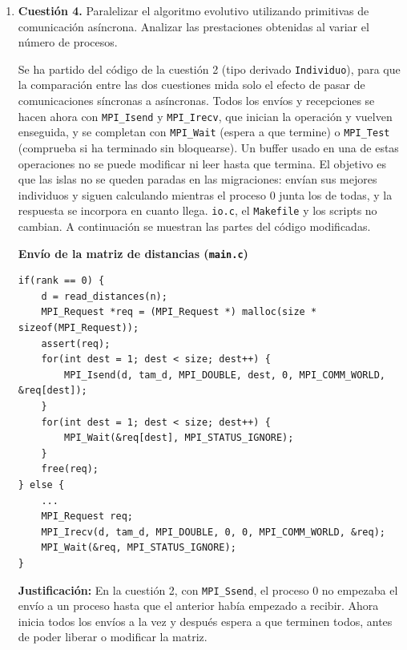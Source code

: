 \documentclass[12pt]{article}
\begin{document}
\begin{enumerate}
\newpage
\item \textbf{Cuestión 4.} Paralelizar el algoritmo evolutivo utilizando primitivas de comunicación asíncrona. Analizar las prestaciones obtenidas al variar el número de procesos.




Se ha partido del código de la cuestión 2 (tipo derivado \texttt{Individuo}), para que la comparación entre las dos cuestiones mida solo el efecto de pasar de comunicaciones síncronas a asíncronas. Todos los envíos y recepciones se hacen ahora con \texttt{MPI\_Isend} y \texttt{MPI\_Irecv}, que inician la operación y vuelven enseguida, y se completan con \texttt{MPI\_Wait} (espera a que termine) o \texttt{MPI\_Test} (comprueba si ha terminado sin bloquearse). Un buffer usado en una de estas operaciones no se puede modificar ni leer hasta que termina. El objetivo es que las islas no se queden paradas en las migraciones: envían sus mejores individuos y siguen calculando mientras el proceso 0 junta los de todas, y la respuesta se incorpora en cuanto llega. \texttt{io.c}, el \texttt{Makefile} y los scripts no cambian. A continuación se muestran las partes del código modificadas.


\medskip
\noindent\textbf{Envío de la matriz de distancias (\texttt{main.c})}\par
\smallskip

\begin{lstlisting}[style=EstiloC]
if(rank == 0) {
	d = read_distances(n);
	MPI_Request *req = (MPI_Request *) malloc(size * sizeof(MPI_Request));
	assert(req);
	for(int dest = 1; dest < size; dest++) {
		MPI_Isend(d, tam_d, MPI_DOUBLE, dest, 0, MPI_COMM_WORLD, &req[dest]);
	}
	for(int dest = 1; dest < size; dest++) {
		MPI_Wait(&req[dest], MPI_STATUS_IGNORE);
	}
	free(req);
} else {
	...
	MPI_Request req;
	MPI_Irecv(d, tam_d, MPI_DOUBLE, 0, 0, MPI_COMM_WORLD, &req);
	MPI_Wait(&req, MPI_STATUS_IGNORE);
}
\end{lstlisting}

\textbf{Justificación:} En la cuestión 2, con \texttt{MPI\_Ssend}, el proceso 0 no empezaba el envío a un proceso hasta que el anterior había empezado a recibir. Ahora inicia todos los envíos a la vez y después espera a que terminen todos, antes de poder liberar o modificar la matriz.

\vspace{0.5cm}


\end{enumerate}
\end{document}
